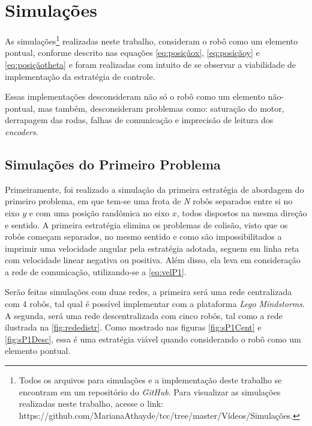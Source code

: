 \chapter{Simulações}
\label{chap:Simulacoes}

As simulações\footnote{Todos os arquivos para simulações e a implementação deste trabalho se encontram em um repositório do \emph{GitHub}. Para visualizar as simulações realizadas neste trabalho, acesse o link: https://github.com/MarianaAthayde/tcc/tree/master/Vídeos/Simulações.} realizadas neste trabalho, consideram o robô como um elemento pontual, conforme descrito nas equações \ref{eq:posiçãox}, \ref{eq:posiçãoy} e \ref{eq:posiçãotheta} e foram realizadas com intuito de se observar a viabilidade de implementação da estratégia de controle. 

Essas implementações desconsideram não só o robô como um elemento não-pontual, mas também, desconsideram problemas como: saturação do motor, derrapagem das rodas, falhas de comunicação e imprecisão de leitura dos \emph{encoders}. 

\section{Simulações do Primeiro Problema}
\label{sec:SimulacaoP1}

Primeiramente, foi realizado a simulação da primeira estratégia de abordagem do primeiro problema, em que tem-se uma frota de \emph{N} robôs separados entre si no eixo $y$ e com uma posição randômica no eixo $x$, todos dispostos na mesma direção e sentido. A primeira estratégia elimina os problemas de colisão, visto que os robôs começam separados, no mesmo sentido e como são impossibilitados a imprimir uma velocidade angular pela estratégia adotada, seguem em linha reta com velocidade linear negativa ou positiva. Além disso, ela leva em consideração a rede de comunicação, utilizando-se a \autoref{eq:velP1}. 

Serão feitas simulações com duas redes, a primeira será uma rede centralizada com 4 robôs, tal qual é possível implementar com a plataforma \emph{Lego Mindstorms\textregistered}. A segunda, será uma rede descentralizada com cinco robôs, tal como a rede ilustrada na \autoref{fig:rededistr}. Como mostrado nas figuras \ref{fig:sP1Cent} e \ref{fig:sP1Desc}, essa é uma estratégia viável quando considerando o robô como um elemento pontual.


